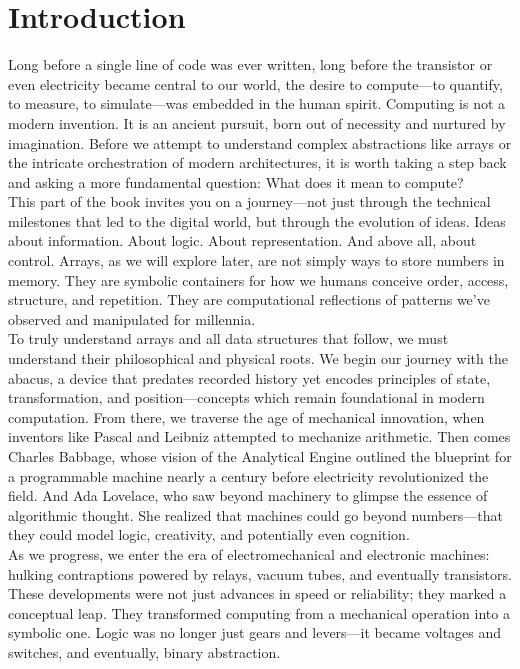 \documentclass[12pt, oneside]{book}
\begin{document}
	\section*{Introduction}
	Long before a single line of code was ever written, long before the transistor or even electricity became central to our world, the desire to compute—to quantify, to measure, to simulate—was embedded in the human spirit. Computing is not a modern invention. It is an ancient pursuit, born out of necessity and nurtured by imagination. Before we attempt to understand complex abstractions like arrays or the intricate orchestration of modern architectures, it is worth taking a step back and asking a more fundamental question: What does it mean to compute?\\
	This part of the book invites you on a journey—not just through the technical milestones that led to the digital world, but through the evolution of ideas. Ideas about information. About logic. About representation. And above all, about control. Arrays, as we will explore later, are not simply ways to store numbers in memory. They are symbolic containers for how we humans conceive order, access, structure, and repetition. They are computational reflections of patterns we've observed and manipulated for millennia.\\
	To truly understand arrays and all data structures that follow, we must understand their philosophical and physical roots. We begin our journey with the abacus, a device that predates recorded history yet encodes principles of state, transformation, and position—concepts which remain foundational in modern computation. From there, we traverse the age of mechanical innovation, when inventors like Pascal and Leibniz attempted to mechanize arithmetic. Then comes Charles Babbage, whose vision of the Analytical Engine outlined the blueprint for a programmable machine nearly a century before electricity revolutionized the field. And Ada Lovelace, who saw beyond machinery to glimpse the essence of algorithmic thought. She realized that machines could go beyond numbers—that they could model logic, creativity, and potentially even cognition.\\
	As we progress, we enter the era of electromechanical and electronic machines: hulking contraptions powered by relays, vacuum tubes, and eventually transistors. These developments were not just advances in speed or reliability; they marked a conceptual leap. They transformed computing from a mechanical operation into a symbolic one. Logic was no longer just gears and levers—it became voltages and switches, and eventually, binary abstraction.\\
\end{document}
